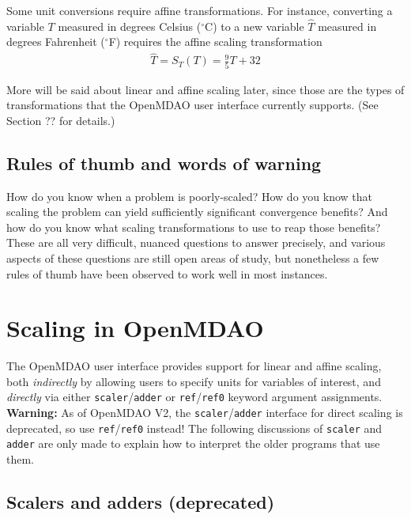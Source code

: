 \documentclass{article}
\begin{document}
\noindent
Some unit conversions require affine transformations. For instance, converting a variable $T$ measured in degrees Celsius ($^{\circ}$C) to a new variable $\hat{T}$ measured in degrees Fahrenheit ($^{\circ}$F) requires the affine scaling transformation
\begin{align*}
    \hat{T} = S_T(T) = \frac{9}{5}T + 32
\end{align*}

\noindent
More will be said about linear and affine scaling later, since those are the types of transformations that the OpenMDAO user interface currently supports. (See Section ?? for details.)

\subsection*{Rules of thumb and words of warning}

How do you know when a problem is poorly-scaled? How do you know that scaling the
problem can yield sufficiently significant convergence benefits? And how do you know what scaling transformations to use to reap those benefits? These are all very difficult, nuanced questions to answer precisely, and various aspects of these questions are still open areas of study, but nonetheless a few rules of thumb have been observed to work well in most instances.

\newpage
\section{Scaling in OpenMDAO}

The OpenMDAO user interface provides support for linear and affine scaling, both \textit{indirectly} by allowing users to specify units for variables of interest, and \textit{directly} via either \texttt{scaler}/\texttt{adder} or \texttt{ref}/\texttt{ref0} keyword argument assignments. \\

\noindent
\textbf{Warning:} As of OpenMDAO V2, the \texttt{scaler}/\texttt{adder} interface for direct scaling is deprecated, so use \texttt{ref}/\texttt{ref0} instead! The following discussions of \texttt{scaler} and \texttt{adder} are only made to explain how to interpret the older programs that use them.

\subsection*{Scalers and adders (deprecated)}
\end{document}
